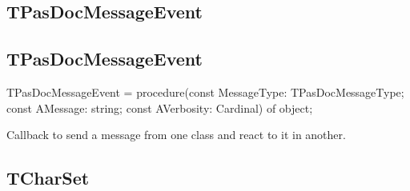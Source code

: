 \documentclass{report}
\newif\ifpdf
\begin{document}
\subsection*{\large{\textbf{TPasDocMessageEvent}}\normalsize\hspace{1ex}\hrulefill}
\else
\subsection*{TPasDocMessageEvent}
\fi
\label{PasDoc_Types-TPasDocMessageEvent}
\begin{list}{}{
\setlength{\itemindent}{0cm}
\setlength{\listparindent}{0cm}
\setlength{\leftmargin}{\evensidemargin}
\addtolength{\leftmargin}{\tmplength}
\settowidth{\labelsep}{X}
\addtolength{\leftmargin}{\labelsep}
\setlength{\labelwidth}{\tmplength}
}
\item[\textbf{Declaration}\hfill]
\ifpdf
\begin{flushleft}
\fi
\begin{ttfamily}
TPasDocMessageEvent = procedure(const MessageType: TPasDocMessageType; const AMessage: string; const AVerbosity: Cardinal) of object;\end{ttfamily}

\ifpdf
\end{flushleft}
\fi

\par
\item[\textbf{Description}]
Callback to send a message from one class and react to it in another.

\end{list}
\ifpdf
\subsection*{\large{\textbf{TCharSet}}\normalsize\hspace{1ex}\hrulefill}
\else
\end{document}
